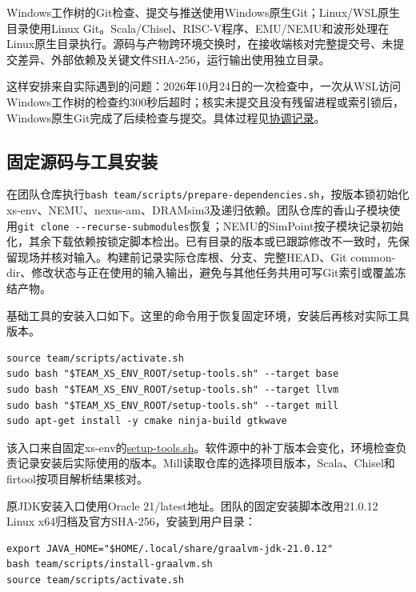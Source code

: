 Windows工作树的Git检查、提交与推送使用Windows原生Git；Linux/WSL原生目录使用Linux Git。Scala/Chisel、RISC-V程序、EMU/NEMU和波形处理在Linux原生目录执行。源码与产物跨环境交换时，在接收端核对完整提交号、未提交差异、外部依赖及关键文件SHA-256，运行输出使用独立目录。

这样安排来自实际遇到的问题：2026年10月24日的一次检查中，一次从WSL访问Windows工作树的检查约300秒后超时；核实未提交且没有残留进程或索引锁后，Windows原生Git完成了后续检查与提交。具体过程见\href{https://github.com/cc77-builder/riscv/issues/2\#issuecomment-6376672788}{协调记录}。

\subsection{固定源码与工具安装}

在团队仓库执行\Verb|bash team/scripts/prepare-dependencies.sh|，按版本锁初始化xs-env、NEMU、nexus-am、DRAMsim3及递归依赖。团队仓库的香山子模块使用\Verb|git clone --recurse-submodules|恢复；NEMU的SimPoint按子模块记录初始化，其余下载依赖按锁定脚本检出。已有目录的版本或已跟踪修改不一致时，先保留现场并核对输入。构建前记录实际仓库根、分支、完整HEAD、Git common-dir、修改状态与正在使用的输入输出，避免与其他任务共用可写Git索引或覆盖冻结产物。

基础工具的安装入口如下。这里的命令用于恢复固定环境，安装后再核对实际工具版本。
\begin{Verbatim}[breaklines,breakanywhere,breaksymbolleft={},breaksymbolright={},fontsize=\footnotesize,baselinestretch=1]
source team/scripts/activate.sh
sudo bash "$TEAM_XS_ENV_ROOT/setup-tools.sh" --target base
sudo bash "$TEAM_XS_ENV_ROOT/setup-tools.sh" --target llvm
sudo bash "$TEAM_XS_ENV_ROOT/setup-tools.sh" --target mill
sudo apt-get install -y cmake ninja-build gtkwave
\end{Verbatim}

该入口来自固定xs-env的\href{https://github.com/OpenXiangShan/xs-env/blob/b0b506481e839a5df8a580e76f5aa246dc60fe7c/setup-tools.sh}{setup-tools.sh}。软件源中的补丁版本会变化，环境检查负责记录安装后实际使用的版本。Mill读取仓库的选择项目版本，Scala、Chisel和firtool按项目解析结果核对。

原JDK安装入口使用Oracle 21/latest地址。团队的固定安装脚本改用21.0.12 Linux x64归档及官方SHA-256，安装到用户目录：
\begin{Verbatim}[breaklines,breakanywhere,breaksymbolleft={},breaksymbolright={},fontsize=\footnotesize,baselinestretch=1]
export JAVA_HOME="$HOME/.local/share/graalvm-jdk-21.0.12"
bash team/scripts/install-graalvm.sh
source team/scripts/activate.sh
\end{Verbatim}

